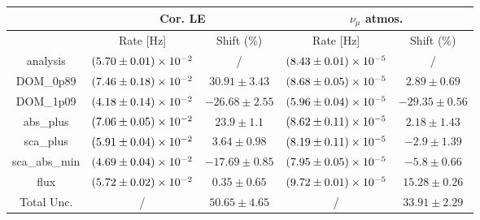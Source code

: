 \documentclass{article}%
\begin{document}
%
\scriptsize%
\noindent%
\begin{tabular}{|c||c|c|c|c|}%
\hline%
&\multicolumn{2}{|c|}{Cor. LE}&\multicolumn{2}{|c|}{$\nu_{\mu}$ atmos.}\\%
\hline%
&Rate {[}Hz{]}&Shift (\%)&Rate {[}Hz{]}&Shift (\%)\\%
\hline%
\hline%
analysis&$\num{5.7\pm0.01e-02}$&/&$\num{8.43\pm0.01e-05}$&/\\%
\hline%
DOM\_0p89&$\num{7.46\pm0.18e-02}$&$30.91\pm3.43$&$\num{8.68\pm0.05e-05}$&$2.89\pm0.69$\\%
\hline%
DOM\_1p09&$\num{4.18\pm0.14e-02}$&$-26.68\pm2.55$&$\num{5.96\pm0.04e-05}$&$-29.35\pm0.56$\\%
\hline%
abs\_plus&$\num{7.06\pm0.05e-02}$&$23.9\pm1.1$&$\num{8.62\pm0.11e-05}$&$2.18\pm1.43$\\%
\hline%
sca\_plus&$\num{5.91\pm0.04e-02}$&$3.64\pm0.98$&$\num{8.19\pm0.11e-05}$&$-2.9\pm1.39$\\%
\hline%
sca\_abs\_min&$\num{4.69\pm0.04e-02}$&$-17.69\pm0.85$&$\num{7.95\pm0.05e-05}$&$-5.8\pm0.66$\\%
\hline%
flux&$\num{5.72\pm0.02e-02}$&$0.35\pm0.65$&$\num{9.72\pm0.01e-05}$&$15.28\pm0.26$\\%
\hline%
\hline%
Total Unc.&/&$50.65\pm4.65$&/&$33.91\pm2.29$\\%
\hline%
\end{tabular}%
\newline%
\end{document}
